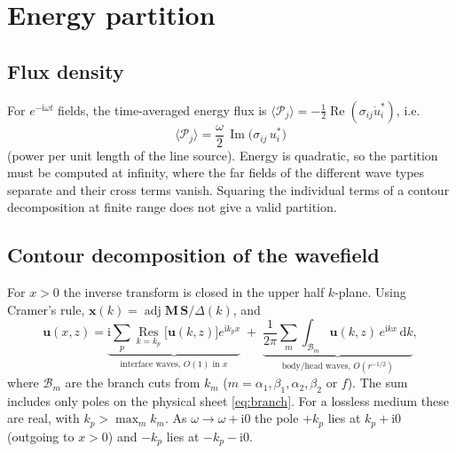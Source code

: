 \documentclass[11pt,a4paper]{article}
\newcommand{\ii}{\mathrm{i}}
\newcommand{\dd}{\mathrm{d}}
\newcommand{\Res}{\operatorname*{Res}}
\newcommand{\RE}{\operatorname{Re}}
\newcommand{\IM}{\operatorname{Im}}
\begin{document}
\section{Energy partition}
\label{sec:energy}

\subsection{Flux density}

For $e^{-\ii\omega t}$ fields, the time-averaged energy flux is
$\langle\mathcal P_j\rangle=-\tfrac12\RE(\sigma_{ij}\dot u_i^{*})$, i.e.
\begin{equation}
  \boxed{\ \langle\mathcal P_j\rangle=\frac{\omega}{2}\,\IM\bigl(\sigma_{ij}\,u_i^{*}\bigr)\ }
\end{equation}
(power per unit length of the line source). Energy is quadratic, so the partition must be computed
at infinity, where the far fields of the different wave types separate and their cross terms vanish.
Squaring the individual terms of a contour decomposition at finite range does not give a valid
partition.

\subsection{Contour decomposition of the wavefield}

For $x>0$ the inverse transform is closed in the upper half $k$-plane. Using Cramer's rule,
$\mathbf x(k)=\operatorname{adj}\mathbf M\,\mathbf S/\Delta(k)$, and
\begin{equation}
  \mathbf u(x,z)=
  \underbrace{\ii\sum_{p}\Res_{k=k_p}\bigl[\mathbf u(k,z)\bigr]e^{\ii k_px}}_{\text{interface waves, }O(1)\text{ in }x}
  \;+\;
  \underbrace{\frac{1}{2\pi}\sum_{m}\int_{\mathcal B_m}\mathbf u(k,z)\,e^{\ii kx}\,\dd k}_{\text{body/head waves, }O(r^{-1/2})},
  \label{eq:contour}
\end{equation}
where $\mathcal B_m$ are the branch cuts from $k_m$ ($m=\alpha_1,\beta_1,\alpha_2,\beta_2$ or $f$).
The sum includes only poles on the physical sheet \eqref{eq:branch}. For a lossless medium these are
real, with $k_p>\max_m k_m$. As $\omega\to\omega+\ii0$ the pole $+k_p$ lies at $k_p+\ii0$
(outgoing to $x>0$) and $-k_p$ lies at $-k_p-\ii0$.
\end{document}
